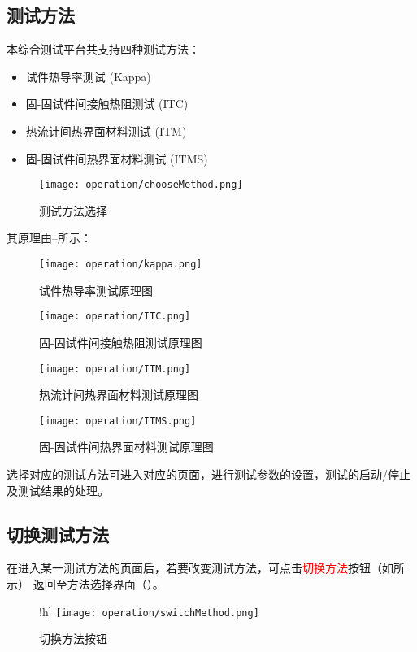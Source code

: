 \subsection{测试方法\label{subsec:testMethods}}
本综合测试平台共支持四种测试方法：
\begin{itemize}
    \item 试件热导率测试 (Kappa)
    \item 固-固试件间接触热阻测试 (ITC)
    \item 热流计间热界面材料测试 (ITM)
    \item 固-固试件间热界面材料测试 (ITMS)
\end{itemize}
\begin{figure}[!h]
    \centering
    \texttt{[image: operation/chooseMethod.png]}
    \caption{ 测试方法选择 \label{fig:chooseMethod}}
\end{figure}
其原理由--所示：
\begin{figure}[H]
    \centering
    \texttt{[image: operation/kappa.png]}
    \caption{ 试件热导率测试原理图 \label{fig:kappa}}
\end{figure}
\begin{figure}[H]
    \centering
    \texttt{[image: operation/ITC.png]}
    \caption{ 固-固试件间接触热阻测试原理图 \label{fig:ITC}}
\end{figure}
\begin{figure}[H]
    \centering
    \texttt{[image: operation/ITM.png]}
    \caption{ 热流计间热界面材料测试原理图 \label{fig:ITM}}
\end{figure}
\begin{figure}[H]
    \centering
    \texttt{[image: operation/ITMS.png]}
    \caption{ 固-固试件间热界面材料测试原理图 \label{fig:ITMS}}
\end{figure}
选择对应的测试方法可进入对应的页面，进行测试参数的设置，测试的启动/停止及测试结果的处理。
\subsection{切换测试方法}
在进入某一测试方法的页面后，若要改变测试方法，可点击\textcolor{red}{切换方法}按钮（如所示）
返回至方法选择界面（）。
\begin{figure}!h]
    \centering
    \texttt{[image: operation/switchMethod.png]}
    \caption{ 切换方法按钮 \label{fig:btnSwitchMethod}}
\end{figure}

